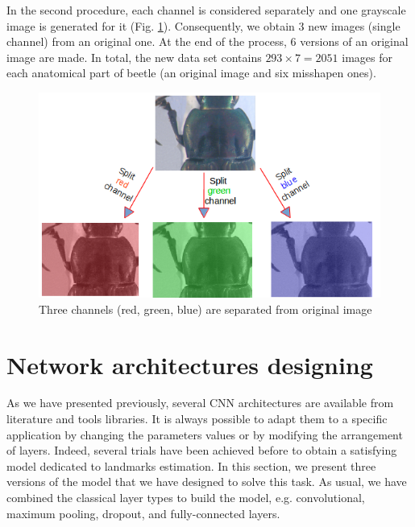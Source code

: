 \documentclass[review]{elsarticle}
\begin{document}
In the second procedure, each channel is considered separately and one
grayscale image is generated for it (Fig. \ref{figaug2}). Consequently, we
obtain 3 new images (single channel) from an original one. At the end
of the process, $6$ versions of an original image are made. In total,
the new data set contains $293 \times 7 = 2051$ images for each
anatomical part of beetle (an original image and six misshapen ones).

\begin{figure}[h]
	\centering
	\includegraphics[scale=0.4]{images/sp_channels}
	\caption{Three channels (red, green, blue) are separated from original image}
	\label{figaug2}
\end{figure}

\section{Network architectures designing}
\label{Sneuralnetwork}
As we have presented previously, several CNN architectures are
available from literature and tools libraries. It is always possible
to adapt them to a specific application by changing the parameters
values or by modifying the arrangement of layers. Indeed, several
trials have been achieved before to obtain a satisfying model
dedicated to landmarks estimation. In this section, we present three
versions of the model that we have designed to solve this task. As
usual, we have combined the classical layer types to build the model,
e.g. convolutional, maximum pooling, dropout, and fully-connected
layers.
\end{document}
